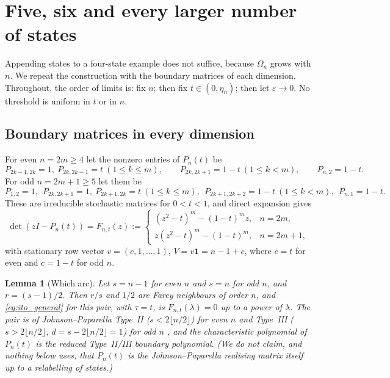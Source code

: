 \documentclass[11pt,a4paper]{article}
\numberwithin{equation}{section}
\newtheorem{lemma}[theorem]{Lemma}
\theoremstyle{definition}
\theoremstyle{remark}
\newcommand{\one}{\mathbf{1}}
\newcommand{\Om}{\Omega}
\newcommand{\eps}{\varepsilon}
\begin{document}
\section{Five, six and every larger number of states}
\label{sec:all_dimensions}

Appending states to a four-state example does not suffice, because
\(\Om_n\) grows with \(n\). We repeat the construction with the
boundary matrices of each dimension. Throughout, the order of limits
is: fix \(n\); then fix \(t\in(0,\eta_n)\); then let \(\eps\to0\). No
threshold is uniform in \(t\) or in \(n\).

\subsection{Boundary matrices in every dimension}

For even \(n=2m\geq4\) let the nonzero entries of \(P_n(t)\) be
\begin{equation}
P_{2k-1,2k}=1,\ P_{2k,2k-1}=t\ (1\le k\le m),\qquad
P_{2k,2k+1}=1-t\ (1\le k<m),\qquad P_{n,2}=1-t .
\label{eq:even_boundary_matrix}
\end{equation}
For odd \(n=2m+1\geq5\) let them be
\begin{equation}
P_{1,2}=1,\ \ P_{2k,2k+1}=1,\ P_{2k+1,2k}=t\ (1\le k\le m),\ \
P_{2k+1,2k+2}=1-t\ (1\le k<m),\ \ P_{n,1}=1-t .
\label{eq:odd_boundary_matrix}
\end{equation}
These are irreducible stochastic matrices for \(0<t<1\), and direct
expansion gives
\begin{equation}
\det(zI-P_n(t))=F_{n,t}(z):=
\begin{cases}
(z^2-t)^m-(1-t)^m z,&n=2m,\\
z(z^2-t)^m-(1-t)^m,&n=2m+1,
\end{cases}
\label{eq:general_Ito}
\end{equation}
with stationary row vector \(v=(c,1,\ldots,1)\), \(V=v\one=n-1+c\),
where \(c=t\) for even and \(c=1-t\) for odd \(n\).

\begin{lemma}[Which arc]
\label{lem:ito_match}
Let \(s=n-1\) for even \(n\) and \(s=n\) for odd \(n\), and
\(r=(s-1)/2\). Then \(r/s\) and \(1/2\) are Farey neighbours of order
\(n\), and \eqref{eq:ito_general} for this pair, with \(\tau=t\), is
\(F_{n,t}(\lambda)=0\) up to a power of \(\lambda\). The pair is of Johnson--Paparella
Type~II (\(s<2\lfloor n/2\rfloor\)) for even \(n\) and Type~III
(\(s>2\lfloor n/2\rfloor\), \(d=s-2\lfloor n/2\rfloor=1\)) for odd \(n\)
\cite[proof of Theorem~3.2]{johnson2017}, and the characteristic
polynomial of \(P_n(t)\) is the reduced Type~II/III boundary
polynomial. (We do not claim, and nothing below uses, that \(P_n(t)\)
is the Johnson--Paparella realising matrix itself up to a relabelling
of states.)
\end{lemma}
\end{document}
